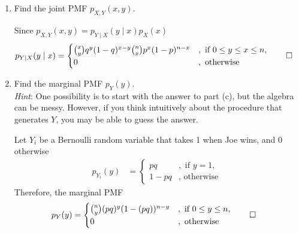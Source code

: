 \documentclass[paper=usletter, fontsize=12pt]{article}
\begin{document}
\begin{enumerate}
\begin{enumerate}
            \item Find the joint PMF $p_{X, Y}(x, y)$.
            \begin{cproof}

                Since $p_{X, Y}(x, y) = p_{Y \mid X}(y \mid x)p_X(x)$
                \begin{align*}
                    p_{Y \mid X}(y \mid x) & =
                    \begin{cases}
                        \binom{x}{y}q^y(1-q)^{x-y}\binom{n}{x}p^x(1-p)^{n-x} &, \text{ if } 0 \le y \le x \le n,\\
                        0 &, \text{ otherwise }
                    \end{cases} \qedhere
                \end{align*}
                \endgroup

            \end{cproof}

            \item Find the marginal PMF $p_{Y}(y)$. \\ \textit{Hint}: One
            possibility is to start with the answer to part (c), but the
            algebra can be messy. However, if you think intuitively about the
            procedure that generates $Y$, you may be able to guess the answer.
            \begin{cproof}

                Let $Y_i$ be a Bernoulli random variable that takes 1 when Joe wins, and 0 otherwise
                \begin{align*}
                    p_{Y_i}(y) & =
                    \begin{cases}
                        pq &, \text{ if } y = 1,\\
                        1 - pq &, \text{ otherwise }
                    \end{cases}
                \end{align*}
                Therefore, the marginal PMF
                \begin{align*}
                    p_{Y}(y) & =
                    \begin{cases}
                        \binom{n}{y}(pq)^y(1-(pq))^{n-y} &, \text{ if } 0 \le y \le n,\\
                        0 &, \text{ otherwise }
                    \end{cases} \qedhere
                \end{align*}
                \endgroup


\end{cproof}
\end{enumerate}
\end{enumerate}
\end{document}
